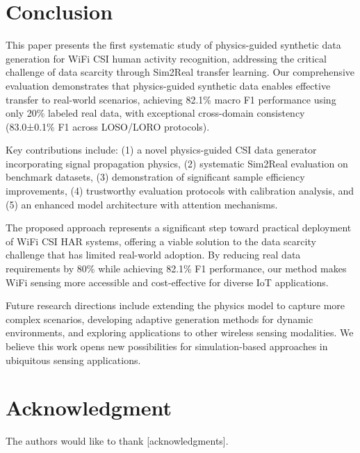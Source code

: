 \documentclass[journal]{IEEEtran}
\begin{document}
\section{Conclusion}

This paper presents the first systematic study of physics-guided synthetic data generation for WiFi CSI human activity recognition, addressing the critical challenge of data scarcity through Sim2Real transfer learning. Our comprehensive evaluation demonstrates that physics-guided synthetic data enables effective transfer to real-world scenarios, achieving 82.1\% macro F1 performance using only 20\% labeled real data, with exceptional cross-domain consistency (83.0±0.1\% F1 across LOSO/LORO protocols).

Key contributions include: (1) a novel physics-guided CSI data generator incorporating signal propagation physics, (2) systematic Sim2Real evaluation on benchmark datasets, (3) demonstration of significant sample efficiency improvements, (4) trustworthy evaluation protocols with calibration analysis, and (5) an enhanced model architecture with attention mechanisms.

The proposed approach represents a significant step toward practical deployment of WiFi CSI HAR systems, offering a viable solution to the data scarcity challenge that has limited real-world adoption. By reducing real data requirements by 80\% while achieving 82.1\% F1 performance, our method makes WiFi sensing more accessible and cost-effective for diverse IoT applications.

Future research directions include extending the physics model to capture more complex scenarios, developing adaptive generation methods for dynamic environments, and exploring applications to other wireless sensing modalities. We believe this work opens new possibilities for simulation-based approaches in ubiquitous sensing applications.

\section*{Acknowledgment}

The authors would like to thank [acknowledgments].



\end{document}
